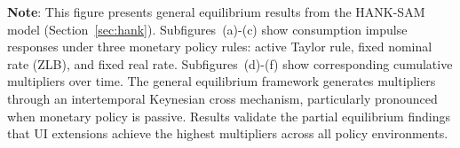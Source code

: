 \documentclass[\PathToRoot/\ProjectName]{subfiles}
\begin{document}
\noindent\parbox{\textwidth}{\footnotesize
  \textbf{Note}: This figure presents general equilibrium results from the HANK-SAM model (Section~\ref{sec:hank}).
  Subfigures~(a)-(c) show consumption impulse responses under three monetary policy rules:
  active Taylor rule, fixed nominal rate (ZLB), and fixed real rate.
  Subfigures~(d)-(f) show corresponding cumulative multipliers over time.
  The general equilibrium framework generates multipliers through an intertemporal Keynesian cross mechanism,
  particularly pronounced when monetary policy is passive.
  Results validate the partial equilibrium findings that UI extensions achieve the highest multipliers
  across all policy environments.
}

\vspace{1em}  %

\smartbib
\end{document}
